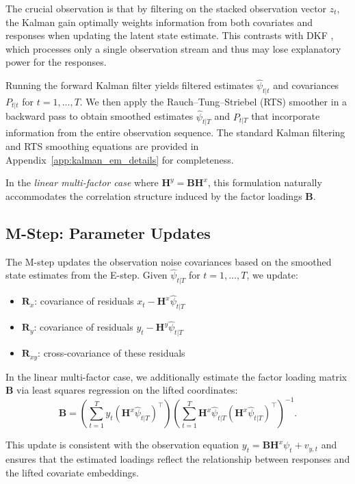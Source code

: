 \documentclass[11pt]{article}
\theoremstyle{plain}
\theoremstyle{definition}
\theoremstyle{remark}
\numberwithin{equation}{section}
\begin{document}
The crucial observation is that by filtering on the stacked observation vector $z_t$, the Kalman gain optimally weights information from both covariates and responses when updating the latent state estimate. This contrasts with DKF \citep{shnitzer2020diffusion}, which processes only a single observation stream and thus may lose explanatory power for the responses.

Running the forward Kalman filter yields filtered estimates $\hat{\psi}_{t|t}$ and covariances $P_{t|t}$ for $t = 1, \ldots, T$. We then apply the Rauch--Tung--Striebel (RTS) smoother \citet{rauch_tung_striebel} in a backward pass to obtain smoothed estimates $\hat{\psi}_{t|T}$ and $P_{t|T}$ that incorporate information from the entire observation sequence. The standard Kalman filtering and RTS smoothing equations are provided in Appendix~\ref{app:kalman_em_details} for completeness.

In the \textit{linear multi-factor case} where $\mathbf{H}^y = \mathbf{B}\mathbf{H}^x$, this formulation naturally accommodates the correlation structure induced by the factor loadings $\mathbf{B}$.

\subsection{M-Step: Parameter Updates}

The M-step updates the observation noise covariances based on the smoothed state estimates from the E-step. Given $\hat{\psi}_{t|T}$ for $t = 1, \ldots, T$, we update:

\begin{itemize}
\item $\mathbf{R}_x$: covariance of residuals $x_t - \mathbf{H}^x \hat{\psi}_{t|T}$
\item $\mathbf{R}_y$: covariance of residuals $y_t - \mathbf{H}^y \hat{\psi}_{t|T}$  
\item $\mathbf{R}_{xy}$: cross-covariance of these residuals
\end{itemize}

In the linear multi-factor case, we additionally estimate the factor loading matrix $\mathbf{B}$ via least squares regression on the lifted coordinates:
\[\mathbf{B} = \left( \sum_{t=1}^{T} y_t (\mathbf{H}^x \hat{\psi}_{t|T})^\top \right) \left( \sum_{t=1}^T \mathbf{H}^x \hat{\psi}_{t|T} (\mathbf{H}^x \hat{\psi}_{t|T})^\top \right)^{-1}.\]

This update is consistent with the observation equation $y_t = \mathbf{B}\mathbf{H}^x\psi_t + v_{y,t}$ and ensures that the estimated loadings reflect the relationship between responses and the lifted covariate embeddings.
\end{document}
